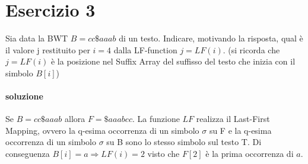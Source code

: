\section{Esercizio 3}

Sia data la BWT $B = cc\$aaab$ di un testo. Indicare, motivando la risposta, qual \`e il valore j restituito per $i = 4$ dalla LF-function $j = LF(i)$.
(si ricorda che $j = LF(i)$ \`e la posizione nel Suffix Array del suffisso del testo che inizia con il simbolo $B[i]$)

\paragraph{soluzione} Se $B = cc\$aaab$ allora $F = \$aaabcc$. La funzione $LF$ realizza il Last-First Mapping, ovvero la q-esima occorrenza di un simbolo $\sigma$ su F e la q-esima occorrenza di un simbolo $\sigma$ su B sono lo stesso simbolo sul testo T. Di conseguenza $B[i] = a \Rightarrow LF(i) = 2$ visto che $F[2]$ \`e la prima occorrenza di $a$.
